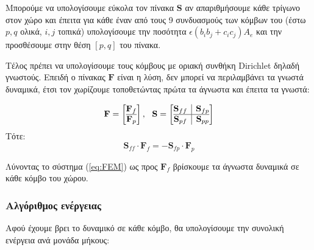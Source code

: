 \documentclass[10pt, letterpaper]{article}
\newcommand{\en}{\selectlanguage{english}}
\newcommand{\gr}{\selectlanguage{greek}}
\begin{document}
Μπορούμε να υπολογίσουμε εύκολα τον πίνακα $\mathbf{S}$ αν απαριθμήσουμε κάθε τρίγωνο στον χώρο και έπειτα για κάθε έναν από τους
9 συνδυασμούς των κόμβων του (έστω $p,q$ ολικά, $i,j$ τοπικά) υπολογίσουμε την ποσότητα $\epsilon (b_ib_j + c_ic_j) A_e$ και την προσθέσουμε στην θέση $[p,q]$ του πίνακα.

Τέλος πρέπει να υπολογίσουμε τους κόμβους με οριακή συνθήκη \en Dirichlet \gr δηλαδή γνωστούς. Επειδή ο πίνακας $\mathbf{F}$ είναι η λύση,
δεν μπορεί να περιλαμβάνει τα γνωστά δυναμικά, έτσι τον χωρίζουμε τοποθετώντας πρώτα τα άγνωστα και έπειτα τα γνωστά:

\[
\mathbf{F} = 
\left[ \begin{array}{@{}c@{}}
\mathbf{F}_f \\
\hline
\mathbf{F}_p
\end{array} \right]
, \ \
\mathbf{S} = 
\left[ \begin{array}{@{}c|c@{}}
  \mathbf{S}_{ff} & \mathbf{S}_{fp} \\
  \hline
  \mathbf{S}_{pf} & \mathbf{S}_{pp}
  \end{array} \right]
\]
Τότε:
\begin{equation}   \label{eq:FEM}
  \mathbf{S}_{ff} \cdot \mathbf{F}_f = - \mathbf{S}_{fp} \cdot \mathbf{F}_p
\end{equation}

Λύνοντας το σύστημα (\ref{eq:FEM}) ως προς $\mathbf{F}_f$ βρίσκουμε τα άγνωστα δυναμικά σε κάθε κόμβο του χώρου.




\subsubsection*{Αλγόριθμος ενέργειας}

Αφού έχουμε βρει το δυναμικό σε κάθε κόμβο, θα υπολογίσουμε την συνολική ενέργεια ανά μονάδα μήκους:
\end{document}
